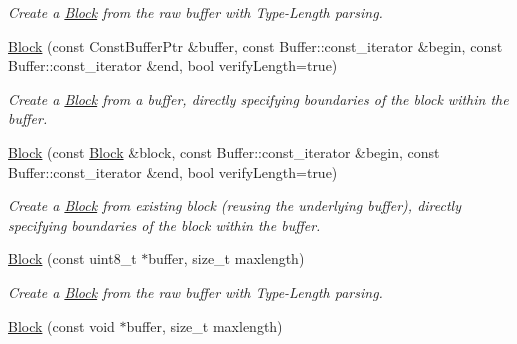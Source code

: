 \begin{DoxyCompactItemize}
\begin{DoxyCompactList}\small\item\em Create a \hyperlink{classndn_1_1Block}{Block} from the raw buffer with Type-\/\+Length parsing. \end{DoxyCompactList}\item 
\hyperlink{classndn_1_1Block_a887825d59e4ba38f381efc635bdaa7f7}{Block} (const Const\+Buffer\+Ptr \&buffer, const Buffer\+::const\+\_\+iterator \&begin, const Buffer\+::const\+\_\+iterator \&end, bool verify\+Length=true)
\begin{DoxyCompactList}\small\item\em Create a \hyperlink{classndn_1_1Block}{Block} from a buffer, directly specifying boundaries of the block within the buffer. \end{DoxyCompactList}\item 
\hyperlink{classndn_1_1Block_a5c848761bfe52866f08bb8c03437781a}{Block} (const \hyperlink{classndn_1_1Block}{Block} \&block, const Buffer\+::const\+\_\+iterator \&begin, const Buffer\+::const\+\_\+iterator \&end, bool verify\+Length=true)
\begin{DoxyCompactList}\small\item\em Create a \hyperlink{classndn_1_1Block}{Block} from existing block (reusing the underlying buffer), directly specifying boundaries of the block within the buffer. \end{DoxyCompactList}\item 
\hyperlink{classndn_1_1Block_a41c3215c4f0cc1314fba773eeda20067}{Block} (const uint8\+\_\+t $\ast$buffer, size\+\_\+t maxlength)\hypertarget{classndn_1_1Block_a41c3215c4f0cc1314fba773eeda20067}{}\label{classndn_1_1Block_a41c3215c4f0cc1314fba773eeda20067}

\begin{DoxyCompactList}\small\item\em Create a \hyperlink{classndn_1_1Block}{Block} from the raw buffer with Type-\/\+Length parsing. \end{DoxyCompactList}\item 
\hyperlink{classndn_1_1Block_ace218230282ebcdc43f6b45c507c0139}{Block} (const void $\ast$buffer, size\+\_\+t maxlength)\hypertarget{classndn_1_1Block_ace218230282ebcdc43f6b45c507c0139}{}\label{classndn_1_1Block_ace218230282ebcdc43f6b45c507c0139}


\end{DoxyCompactItemize}

